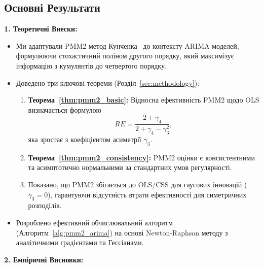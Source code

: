 \documentclass[12pt,a4paper]{article}
\begin{document}
\subsection{Основні Результати}
\label{subsec:main_findings}

\textbf{1. Теоретичні Внески:}

\begin{itemize}
    \item Ми адаптували PMM2 метод Кунченка~\cite{kunchenko2002polynomial} до контексту ARIMA моделей, формулюючи стохастичний поліном другого порядку, який максимізує інформацію з кумулянтів до четвертого порядку.

    \item Доведено три ключові теореми (Розділ~\ref{sec:methodology}):
    \begin{enumerate}
        \item \textbf{Теорема~\ref{thm:pmm2_basic}:} Відносна ефективність PMM2 щодо OLS визначається формулою
        \begin{equation*}
            RE = \frac{2 + \gamma_4}{2 + \gamma_4 - \gamma_3^2},
        \end{equation*}
        яка зростає з коефіцієнтом асиметрії $\gamma_3$.

        \item \textbf{Теорема~\ref{thm:pmm2_consistency}:} PMM2 оцінки є консистентними та асимптотично нормальними за стандартних умов регулярності.

        \item Показано, що PMM2 збігається до OLS/CSS для гаусових інновацій ($\gamma_3 = 0$), гарантуючи відсутність втрати ефективності для симетричних розподілів.
    \end{enumerate}

    \item Розроблено ефективний обчислювальний алгоритм (Алгоритм~\ref{alg:pmm2_arima}) на основі Newton-Raphson методу з аналітичними градієнтами та Гессіанами.
\end{itemize}

\textbf{2. Емпіричні Висновки:}
\end{document}
